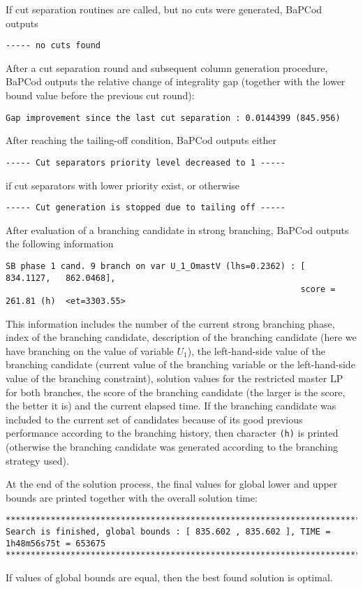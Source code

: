 \documentclass[10pt,a4paper]{article}
\newcommand{\bc}{BaPCod\xspace}
\begin{document}
\medskip If cut separation routines are called, but no cuts were generated, \bc outputs \footnotesize
\begin{verbatim}
----- no cuts found
\end{verbatim}
\normalsize
After a cut separation round and subsequent column generation procedure, \bc outputs the relative change of integrality
gap (together with the lower bound value before the previous cut round):
\footnotesize
\begin{verbatim}
Gap improvement since the last cut separation : 0.0144399 (845.956)
\end{verbatim}
\normalsize
After reaching the tailing-off condition, \bc outputs either 
\footnotesize
\begin{verbatim}
----- Cut separators priority level decreased to 1 -----
\end{verbatim}
\normalsize
if cut separators with lower priority exist, or otherwise
\footnotesize
\begin{verbatim}
----- Cut generation is stopped due to tailing off -----
\end{verbatim}
\normalsize

\medskip After evaluation of a branching candidate in strong branching, \bc outputs the following information
\scriptsize
\begin{verbatim}
SB phase 1 cand. 9 branch on var U_1_OmastV (lhs=0.2362) : [  834.1127,   862.0468], 
                                                           score = 261.81 (h)  <et=3303.55>
\end{verbatim}
\normalsize This information includes the number of the current strong branching phase, index of the branching
candidate, description of the branching candidate (here we have branching on the value of variable $U_1$), the
left-hand-side value of the branching candidate (current value of the branching variable or the left-hand-side value of
the branching constraint), solution values for the restricted master LP for both branches, the score of the branching
candidate (the larger is the score, the better it is) and the current elapsed time. If the branching candidate was
included to the current set of candidates because of its good previous performance according to the branching history,
then character \verb+(h)+ is printed (otherwise the branching candidate was generated according to the
branching strategy used).

\medskip At the end of the solution process, the final values for global lower and upper bounds are printed together
with the overall solution time: \scriptsize
\begin{verbatim}
********************************************************************************************
Search is finished, global bounds : [ 835.602 , 835.602 ], TIME = 1h48m56s75t = 653675
********************************************************************************************
\end{verbatim}
\normalsize
If values of global bounds are equal, then the best found solution is optimal. 
\end{document}
